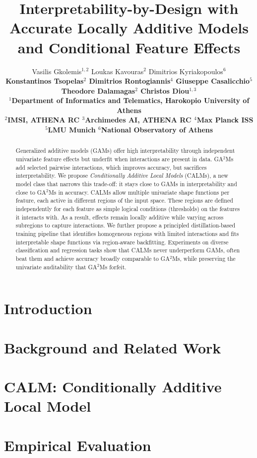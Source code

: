 \documentclass{article}
\title{Interpretability-by-Design with Accurate Locally Additive Models and Conditional Feature Effects}
\author{%
  Vasilis Gkolemis$^{1,2}$ \quad
  Loukas Kavouras$^{2}$ \quad
  Dimitrios Kyriakopoulos$^{6}$ \\
  \bfseries
  Konstantinos Tsopelas$^{2}$ \quad
  Dimitrios Rontogiannis$^{4}$ \quad
  Giuseppe Casalicchio$^{5}$ \\
  \bfseries
  Theodore Dalamagas$^{2}$ \quad
  Christos Diou$^{1,3}$ \\[0.5em]
  $^{1}$Department of Informatics and Telematics, Harokopio University of Athens \\
  $^{2}$IMSI, ATHENA RC \quad
  $^{3}$Archimedes AI, ATHENA RC \quad
  $^{4}$Max Planck ISS \\
  $^{5}$LMU Munich \quad
  $^{6}$National Observatory of Athens
}
\theoremstyle{plain}
\theoremstyle{definition}
\theoremstyle{remark}
\begin{document}
\maketitle

\begin{abstract}
Generalized additive models (GAMs) offer high interpretability through independent univariate feature effects but underfit when interactions are present in data.
GA$^2$Ms add selected pairwise interactions, which improves accuracy, but sacrifices interpretability.
We propose \emph{Conditionally Additive Local Models} (CALMs), a new model class that narrows this trade-off: it stays close to GAMs in interpretability and close to GA$^2$Ms in accuracy.
CALMs allow multiple univariate shape functions per feature, each active in different regions of the input space.
These regions are defined independently for each feature as simple logical conditions (thresholds) on the features it interacts with.
As a result, effects remain locally additive while varying across subregions to capture interactions.
We further propose a principled distillation-based training pipeline that identifies homogeneous regions with limited interactions and fits interpretable shape functions via region-aware backfitting.
Experiments on diverse classification and regression tasks show that CALMs never underperform GAMs, often beat them and achieve accuracy broadly comparable to GA$^2$Ms, while preserving the univariate auditability that GA$^2$Ms forfeit.
\end{abstract}

\section{Introduction}
\label{sec:introduction}


\section{Background and Related Work}
\label{sec:related-work}


\section{CALM: Conditionally Additive Local Model}
\label{sec:ram}


\section{Empirical Evaluation}
\label{sec:empirical-evaluation}

\end{document}
